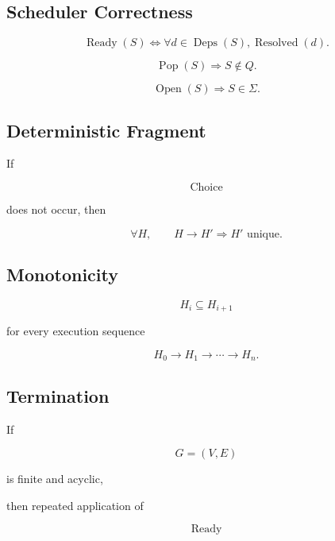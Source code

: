 \documentclass[12pt,oneside]{article}
\theoremstyle{definition}
\theoremstyle{remark}
\begin{document}
\subsection*{Scheduler Correctness}

\[
\operatorname{Ready}(S)
\Longleftrightarrow
\forall
d\in
\operatorname{Deps}(S),
\operatorname{Resolved}(d).
\]

\[
\operatorname{Pop}(S)
\Longrightarrow
S
\notin
Q.
\]

\[
\operatorname{Open}(S)
\Longrightarrow
S
\in
\Sigma.
\]

\subsection*{Deterministic Fragment}

If

\[
\operatorname{Choice}
\]

does not occur, then

\[
\forall
H,
\qquad
H
\longrightarrow
H'
\Longrightarrow
H'
\text{ unique}.
\]

\subsection*{Monotonicity}

\[
H_i
\subseteq
H_{i+1}
\]

for every execution sequence

\[
H_0
\longrightarrow
H_1
\longrightarrow
\cdots
\longrightarrow
H_n.
\]

\subsection*{Termination}

If

\[
G=(V,E)
\]

is finite and acyclic,

then repeated application of

\[
\operatorname{Ready}
\]
\end{document}
